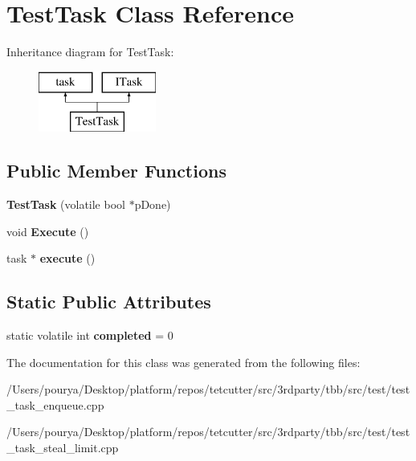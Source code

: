 \hypertarget{classTestTask}{}\section{Test\+Task Class Reference}
\label{classTestTask}
Inheritance diagram for Test\+Task\+:\begin{figure}[H]
\begin{center}
\leavevmode
\includegraphics[height=2.000000cm]{classTestTask}
\end{center}
\end{figure}
\subsection*{Public Member Functions}
\begin{DoxyCompactItemize}
\item 
\hypertarget{classTestTask_a0e3a583594f2dfd4916d56f1c51bfe60}{}{\bfseries Test\+Task} (volatile bool $\ast$p\+Done)\label{classTestTask_a0e3a583594f2dfd4916d56f1c51bfe60}

\item 
\hypertarget{classTestTask_a458f49980d4e43fb4fbd21867c4ab96e}{}void {\bfseries Execute} ()\label{classTestTask_a458f49980d4e43fb4fbd21867c4ab96e}

\item 
\hypertarget{classTestTask_a97efbfc679890f8ae761c3b8d181f038}{}task $\ast$ {\bfseries execute} ()\label{classTestTask_a97efbfc679890f8ae761c3b8d181f038}

\end{DoxyCompactItemize}
\subsection*{Static Public Attributes}
\begin{DoxyCompactItemize}
\item 
\hypertarget{classTestTask_ae85a6b4a9efdafffc95ee5582f715aba}{}static volatile int {\bfseries completed} = 0\label{classTestTask_ae85a6b4a9efdafffc95ee5582f715aba}

\end{DoxyCompactItemize}


The documentation for this class was generated from the following files\+:\begin{DoxyCompactItemize}
\item 
/\+Users/pourya/\+Desktop/platform/repos/tetcutter/src/3rdparty/tbb/src/test/test\+\_\+task\+\_\+enqueue.\+cpp\item 
/\+Users/pourya/\+Desktop/platform/repos/tetcutter/src/3rdparty/tbb/src/test/test\+\_\+task\+\_\+steal\+\_\+limit.\+cpp\end{DoxyCompactItemize}
